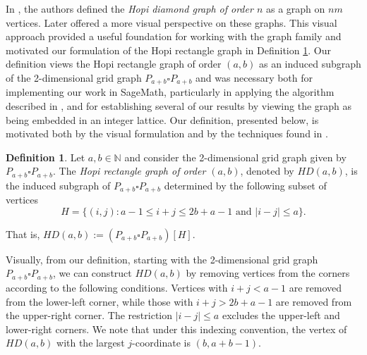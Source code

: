 \documentclass[11pt]{article}
\theoremstyle{plain} \newtheorem{question}{Question}
\theoremstyle{definition}
\newtheorem{defn}[thm]{Definition}
\newtheorem{obs}[thm]{Observation}
\begin{document}
In \cite{KnuthAztecDiamond}, the authors defined the \textit{Hopi diamond graph of order $n$} as a graph on $nm$ vertices. Later \cite{VisualDefAztecDiamond} offered a more visual perspective on these graphs. This visual approach provided a useful foundation for working with the graph family and motivated our formulation of the Hopi rectangle graph in Definition \ref{def:UpdatedDefAD_{m,n}}. Our definition views the Hopi rectangle graph of order $(a,b)$ as an induced subgraph of the 2-dimensional grid graph $P_{a+b}\square P_{a+b}$ and was necessary both for implementing our work in SageMath, particularly in applying the algorithm described in \cite{moruzziLeakyForcing}, and for establishing several of our results by viewing the graph as being embedded in an integer lattice. Our definition, presented below, is motivated both by the visual formulation and by the techniques found in \cite{TechniquesLowerBoundZF}.


\begin{defn}\label{def:UpdatedDefAD_{m,n}}
    Let $a,b \in \mathbb{N}$ and consider the 2-dimensional grid graph given by $P_{a+b} \square P_{a+b}$. The \textit{Hopi rectangle graph of order $(a,b)$}, denoted by $HD(a,b)$, is the induced subgraph of $P_{a+b}\square P_{a+b}$ determined by the following subset of vertices
    $$H = \{(i,j): a-1 \leq i+j \leq 2b+a-1 \text{ and } |i-j| \leq a\}.$$

    \noindent That is, $HD(a,b) := (P_{a+b}\square P_{a+b})[H]$.

\end{defn} 

Visually, from our definition, starting with the 2-dimensional grid graph $P_{a+b} \square P_{a+b}$, we can construct $HD(a,b)$ by removing vertices from the corners according to the following conditions. Vertices with $i+j < a-1$ are removed from the lower-left corner, while those with $i+j > 2b+a-1$ are removed from the upper-right corner. The restriction $|i-j| \leq a$ excludes the upper-left and lower-right corners. We note that under this indexing convention, the vertex of $HD(a,b)$ with the largest $j$-coordinate is $(b, a+b-1)$.

\end{document}
